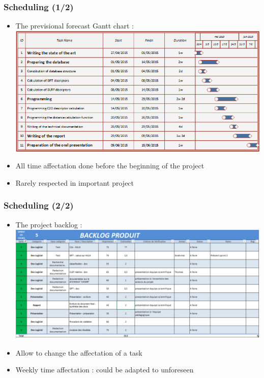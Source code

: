\documentclass[xcolor=table]{beamer}
\begin{document}
\begin{frame} \frametitle{Scheduling (1/2)}

\begin{itemize}
\item The previsional forecast Gantt chart  :
\includegraphics[scale=0.40]{GanttPrez.png}
\item All time affectation done before the beginning of the project
\item Rarely respected in important project
\end{itemize}

\end{frame}


\begin{frame} \frametitle{Scheduling (2/2)}


\begin{itemize}
\item The project backlog  :
\includegraphics[scale=0.30]{backlog.png}
\item Allow to change the affectation of a task
\item Weekly time affectation : could be adapted to unforeseen
\end{itemize}


\end{frame}
\end{document}
